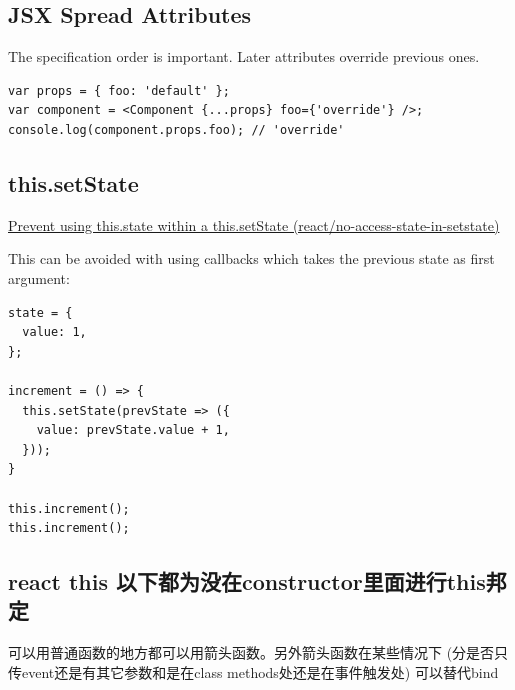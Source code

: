 \documentclass[a4paper, 12pt]{article}
\begin{document}
\subsection{JSX Spread Attributes}
The specification order is important. Later attributes override previous ones.
\begin{verbatim}
var props = { foo: 'default' };
var component = <Component {...props} foo={'override'} />;
console.log(component.props.foo); // 'override'
\end{verbatim}


\subsection{this.setState}
\href{https://github.com/yannickcr/eslint-plugin-react/blob/HEAD/docs/rules/no-access-state-in-setstate.md}{Prevent using this.state within a this.setState (react/no-access-state-in-setstate)}

This can be avoided with using callbacks which takes the previous state as first argument:
\begin{verbatim}
state = {
  value: 1,
};

increment = () => {
  this.setState(prevState => ({
    value: prevState.value + 1,
  }));
}

this.increment();
this.increment();
\end{verbatim}

\subsection{react this {\color{red}以下都为没在constructor里面进行this邦定}}
可以用普通函数的地方都可以用箭头函数。另外箭头函数在某些情况下 (分是否只传event还是有其它参数和是在class methods处还是在事件触发处) 可以替代bind
\end{document}
